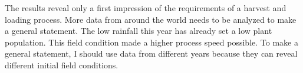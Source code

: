 The results reveal only a first impression of the requirements of a harvest and loading process. More data from around the world needs to be analyzed to make a general statement. The low rainfall this year has already set a low plant population. This field condition made a higher process speed possible. To make a general statement, I should use data from different years because they can reveal different initial field conditions.



